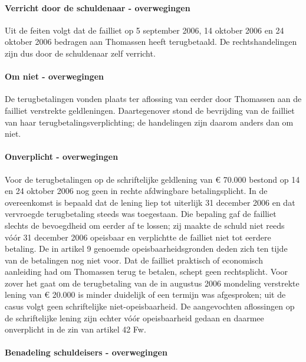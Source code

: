 \documentclass[
  dutch,
  a4paper,
]{article}
\begin{document}
\paragraph{Verricht door de schuldenaar - overwegingen}\label{verricht-door-de-schuldenaar---overwegingen-73}

Uit de feiten volgt dat de failliet op 5 september 2006, 14 oktober 2006 en 24 oktober 2006 bedragen aan Thomassen heeft terugbetaald. De rechtshandelingen zijn dus door de schuldenaar zelf verricht.

\paragraph{Om niet - overwegingen}\label{om-niet---overwegingen-73}

De terugbetalingen vonden plaats ter aflossing van eerder door Thomassen aan de failliet verstrekte geldleningen. Daartegenover stond de bevrijding van de failliet van haar terugbetalingsverplichting; de handelingen zijn daarom anders dan om niet.

\paragraph{Onverplicht - overwegingen}\label{onverplicht---overwegingen-73}

Voor de terugbetalingen op de schriftelijke geldlening van € 70.000 bestond op 14 en 24 oktober 2006 nog geen in rechte afdwingbare betalingsplicht. In de overeenkomst is bepaald dat de lening liep tot uiterlijk 31 december 2006 en dat vervroegde terugbetaling steeds was toegestaan. Die bepaling gaf de failliet slechts de bevoegdheid om eerder af te lossen; zij maakte de schuld niet reeds vóór 31 december 2006 opeisbaar en verplichtte de failliet niet tot eerdere betaling. De in artikel 9 genoemde opeisbaarheidsgronden deden zich ten tijde van de betalingen nog niet voor. Dat de failliet praktisch of economisch aanleiding had om Thomassen terug te betalen, schept geen rechtsplicht. Voor zover het gaat om de terugbetaling van de in augustus 2006 mondeling verstrekte lening van € 20.000 is minder duidelijk of een termijn was afgesproken; uit de casus volgt geen schriftelijke niet-opeisbaarheid. De aangevochten aflossingen op de schriftelijke lening zijn echter vóór opeisbaarheid gedaan en daarmee onverplicht in de zin van artikel 42 Fw.

\paragraph{Benadeling schuldeisers - overwegingen}\label{benadeling-schuldeisers---overwegingen-73}
\end{document}
